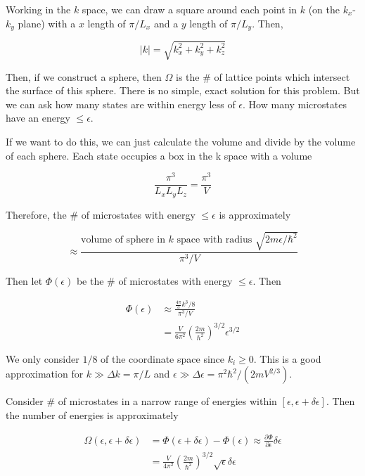 \documentclass{article}
\newtheorem{one minute paper}[theorem]{One Minute Paper}
\begin{document}
Working in the $k$ space, we can draw a square around each point in $k$ (on the $k_x$-$k_y$ plane) with a $x$ length of $\pi/L_x$ and a $y$ length of $\pi/L_y$. Then, 

\begin{equation}
    |k| = \sqrt{k_x^2 + k_y^2 + k_z^2}
\end{equation}

Then, if we construct a sphere, then $\Omega$ is the \# of lattice points which intersect the surface of this sphere. There is no simple, exact solution for this problem. But we can ask how many states are within energy less of $\epsilon$. How many microstates have an energy $\leq \epsilon$. 

If we want to do this, we can just calculate the volume and divide by the volume of each sphere. Each state occupies a box in the k space with a volume 

\begin{equation}
    \frac{\pi^3}{L_xL_yL_z} = \frac{\pi^3}{V}
\end{equation}

Therefore, the \# of microstates with energy $\leq \epsilon$ is approximately 

\begin{equation}
    \approx \frac{\text{volume of sphere in $k$ space with radius $\sqrt{2m \epsilon/\hbar^2}$}}{\pi^3/V}
\end{equation}

Then let $\Phi(\epsilon)$ be the \# of microstates with energy $\leq \epsilon$. Then 

\begin{align}
    \Phi(\epsilon) &\approx \frac{\frac{4\pi}{3}k^3/8}{\pi^3/V} \\
    &= \frac{V}{6\pi^2}\left( \frac{2m}{\hbar^2} \right)^{3/2}\epsilon^{3/2}
\end{align}

We only consider $1/8$ of the coordinate space since $k_i \geq 0$. This is a good approximation for $k \gg \Delta k = \pi/L$ and $\epsilon \gg \Delta \epsilon = \pi^2\hbar^2/(2mV^{2/3})$. 

Consider \# of microstates in a narrow range of energies within $[\epsilon, \epsilon + \delta \epsilon]$. Then the number of energies is approximately 

\begin{align}
    \Omega(\epsilon, \epsilon + \delta \epsilon) &= \Phi(\epsilon + \delta\epsilon) - \Phi(\epsilon) \approx \frac{\partial \Phi}{\partial \epsilon}\delta \epsilon \\
    &= \frac{V}{4\pi^2}\left( \frac{2m}{\hbar^2} \right)^{3/2}\sqrt{\epsilon}\delta \epsilon
\end{align}
\end{document}
